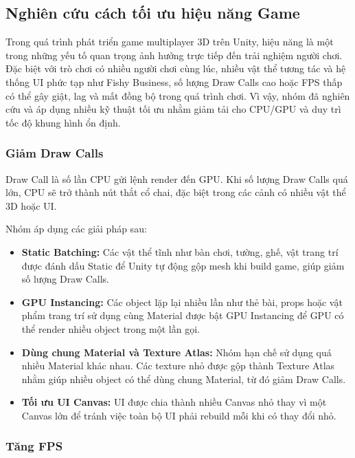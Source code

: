 \subsection{Nghiên cứu cách tối ưu hiệu năng Game}

Trong quá trình phát triển game multiplayer 3D trên Unity, hiệu năng là một trong những yếu tố quan trọng ảnh hưởng trực tiếp đến trải nghiệm người chơi. Đặc biệt với trò chơi có nhiều người chơi cùng lúc, nhiều vật thể tương tác và hệ thống UI phức tạp như Fishy Business, số lượng Draw Calls cao hoặc FPS thấp có thể gây giật, lag và mất đồng bộ trong quá trình chơi. Vì vậy, nhóm đã nghiên cứu và áp dụng nhiều kỹ thuật tối ưu nhằm giảm tải cho CPU/GPU và duy trì tốc độ khung hình ổn định.

\subsubsection{Giảm Draw Calls}

Draw Call là số lần CPU gửi lệnh render đến GPU. Khi số lượng Draw Calls quá lớn, CPU sẽ trở thành nút thắt cổ chai, đặc biệt trong các cảnh có nhiều vật thể 3D hoặc UI.

Nhóm áp dụng các giải pháp sau:

\begin{itemize}
    \item \textbf{Static Batching:}
    Các vật thể tĩnh như bàn chơi, tường, ghế, vật trang trí được đánh dấu Static để Unity tự động gộp mesh khi build game, giúp giảm số lượng Draw Calls.

    \item \textbf{GPU Instancing:}
    Các object lặp lại nhiều lần như thẻ bài, props hoặc vật phẩm trang trí sử dụng cùng Material được bật GPU Instancing để GPU có thể render nhiều object trong một lần gọi.

    \item \textbf{Dùng chung Material và Texture Atlas:}
    Nhóm hạn chế sử dụng quá nhiều Material khác nhau. Các texture nhỏ được gộp thành Texture Atlas nhằm giúp nhiều object có thể dùng chung Material, từ đó giảm Draw Calls.

    \item \textbf{Tối ưu UI Canvas:}
    UI được chia thành nhiều Canvas nhỏ thay vì một Canvas lớn để tránh việc toàn bộ UI phải rebuild mỗi khi có thay đổi nhỏ.
\end{itemize}

\subsubsection{Tăng FPS}

